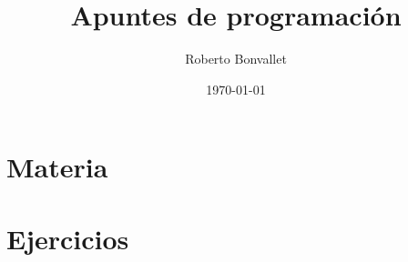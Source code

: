 \documentclass[dvipsnames]{memoir}
\title{Apuntes de programación}
\author{Roberto Bonvallet}
\date{\today}
\begin{document}
  \maketitle
  \part{Materia}
  
  \part{Ejercicios}
  
  
  
%  
\end{document}
